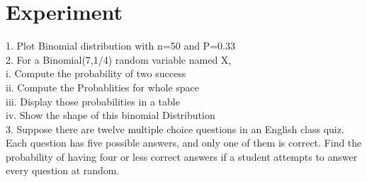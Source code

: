 \documentclass{article}\usepackage[]{graphicx}\usepackage[]{xcolor}
\begin{document}
\section*{Experiment}
1. Plot Binomial distribution with n=50 and P=0.33\\
2. For a Binomial(7,1/4) random variable named X,\\
i. Compute the probability of two success\\
ii. Compute the Probablities for whole space\\
iii. Display those probabilities in a table\\
iv. Show the shape of this binomial Distribution\\
3. Suppose there are twelve multiple choice questions in an English class quiz.
Each question has five possible answers, and only one of them is correct. Find the
probability of having four or less correct answers if a student attempts to answer every
question at random.
\newpage
\end{document}
